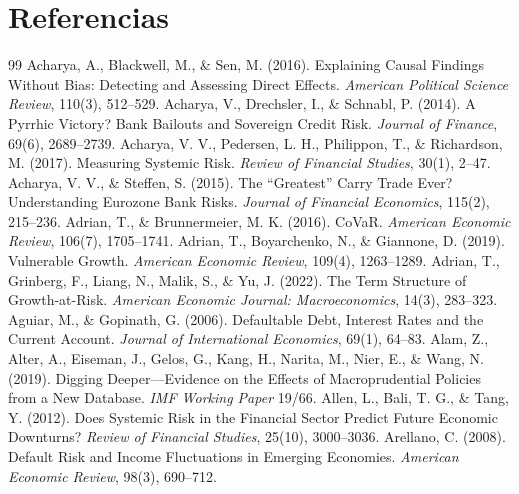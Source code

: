 \chapter*{Referencias}

\begin{thebibliography}{99}
\sloppy\small
{} Acharya, A., Blackwell, M., \& Sen, M. (2016). Explaining Causal Findings Without Bias: Detecting and Assessing Direct Effects. \textit{American Political Science Review}, 110(3), 512--529.
 Acharya, V., Drechsler, I., \& Schnabl, P. (2014). A Pyrrhic Victory? Bank Bailouts and Sovereign Credit Risk. \textit{Journal of Finance}, 69(6), 2689--2739.
 Acharya, V. V., Pedersen, L. H., Philippon, T., \& Richardson, M. (2017). Measuring Systemic Risk. \textit{Review of Financial Studies}, 30(1), 2--47.
 Acharya, V. V., \& Steffen, S. (2015). The ``Greatest'' Carry Trade Ever? Understanding Eurozone Bank Risks. \textit{Journal of Financial Economics}, 115(2), 215--236.
 Adrian, T., \& Brunnermeier, M. K. (2016). CoVaR. \textit{American Economic Review}, 106(7), 1705--1741.
 Adrian, T., Boyarchenko, N., \& Giannone, D. (2019). Vulnerable Growth. \textit{American Economic Review}, 109(4), 1263--1289.
 Adrian, T., Grinberg, F., Liang, N., Malik, S., \& Yu, J. (2022). The Term Structure of Growth-at-Risk. \textit{American Economic Journal: Macroeconomics}, 14(3), 283--323.
 Aguiar, M., \& Gopinath, G. (2006). Defaultable Debt, Interest Rates and the Current Account. \textit{Journal of International Economics}, 69(1), 64--83.
 Alam, Z., Alter, A., Eiseman, J., Gelos, G., Kang, H., Narita, M., Nier, E., \& Wang, N. (2019). Digging Deeper---Evidence on the Effects of Macroprudential Policies from a New Database. \textit{IMF Working Paper} 19/66.
 Allen, L., Bali, T. G., \& Tang, Y. (2012). Does Systemic Risk in the Financial Sector Predict Future Economic Downturns? \textit{Review of Financial Studies}, 25(10), 3000--3036.
 Arellano, C. (2008). Default Risk and Income Fluctuations in Emerging Economies. \textit{American Economic Review}, 98(3), 690--712.

\end{thebibliography}
